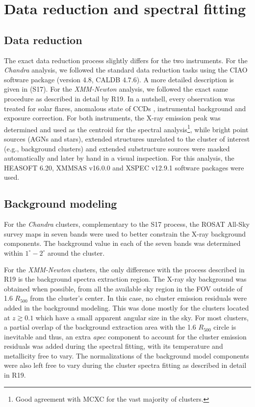 \documentclass{aa}   %
\begin{document}
\section{Data reduction and spectral fitting} \label{spec_fit}

\subsection{Data reduction}

The exact data reduction process slightly differs for the two instruments. For the \textit{Chandra} analysis, we followed the standard data reduction tasks using the CIAO software package (version 4.8, CALDB 4.7.6). A more detailed description is given in \citet{gerrit2} (S17). For the \textit{XMM-Newton} analysis, we followed the exact same procedure as described in detail by R19. In a nutshell, every observation was treated for solar flares, anomalous state of CCDs \citep{kuntz}, instrumental background and exposure correction. For both instruments, the X-ray emission peak was determined and used as the centroid for the spectral analysis\footnote{Good agreement with MCXC for the vast majority of clusters.}, while bright point sources (AGNs and stars), extended structures unrelated to the cluster of interest (e.g., background clusters) and extended substructure sources were masked automatically and later by hand in a visual inspection. For this analysis, the HEASOFT 6.20, XMMSAS v16.0.0 and XSPEC v12.9.1 software packages were used.

\subsection{Background modeling}

For the \textit{Chandra} clusters, complementary to the S17 process, the ROSAT All-Sky survey maps in seven bands \citep{snowden97} were used to better constrain the X-ray background components. The background value in each of the seven bands was determined within $1^{\circ}-2^{\circ}$ around the cluster. 

For the \textit{XMM-Newton} clusters, the only difference with the process described in R19 is the background spectra extraction region. The X-ray sky background was obtained when possible, from all the available sky region in the FOV outside of 1.6 $R_{500}$ from the cluster's center. In this case, no cluster emission residuals were added in the background modeling. This was done mostly for the clusters located at $z\gtrsim 0.1$ which have a small apparent angular size in the sky. For most clusters, a partial overlap of the background extraction area with the 1.6 $R_{500}$ circle is inevitable and thus, an extra \textit{apec} component to account for the cluster emission residuals was added during the spectral fitting, with its temperature and metallicity free to vary. The normalizations of the background model components were also left free to vary during the cluster spectra fitting as described in detail in R19. 
\end{document}
